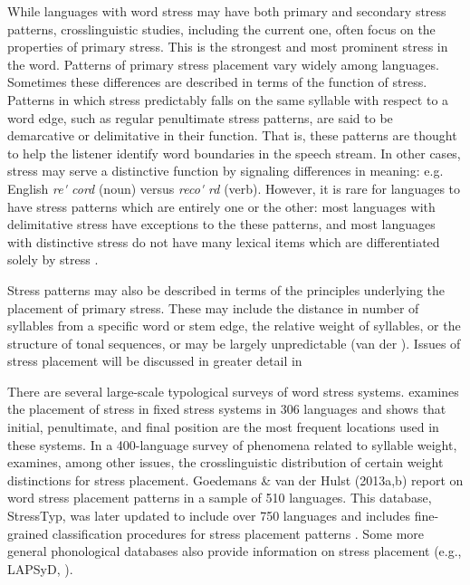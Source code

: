   While languages with word stress may have both primary and secondary stress patterns, crosslinguistic studies, including the current one, often focus on the properties of primary stress. This is the strongest and most prominent stress in the word. Patterns of primary stress placement vary widely among languages. Sometimes these differences are described in terms of the function of stress. Patterns in which stress predictably falls on the same syllable with respect to a word edge, such as regular penultimate stress patterns, are said to be demarcative or delimitative in their function. That is, these patterns are thought to help the listener identify word boundaries in the speech stream. In other cases, stress may serve a distinctive function by signaling differences in meaning: e.g. English \textit{re\'{} cord} (noun) versus \textit{reco\'{} rd} (verb). However, it is rare for languages to have stress patterns which are entirely one or the other: most languages with delimitative stress have exceptions to the these patterns, and most languages with distinctive stress do not have many lexical items which are differentiated solely by stress \citep[14-15]{Cruttenden1997}. 

  Stress patterns may also be described in terms of the principles underlying the placement of primary stress. These may include the distance in number of syllables from a specific word or stem edge, the relative weight of syllables, or the structure of tonal sequences, or may be largely unpredictable (van der \citealt{Hulst2010}). Issues of stress placement will be discussed in greater detail in 

  There are several large-scale typological surveys of word stress systems. \citet{Hyman1977} examines the placement of stress in fixed stress systems in 306 languages and shows that initial, penultimate, and final position are the most frequent locations used in these systems. In a 400-language survey of phenomena related to syllable weight, \citet{Gordon2006} examines, among other issues, the crosslinguistic distribution of certain weight distinctions for stress placement. Goedemans \& van der Hulst (2013a,b) report on word stress placement patterns in a sample of 510 languages. This database, StressTyp, was later updated to include over 750 languages and includes fine-grained classification procedures for stress placement patterns \citep{GoedemansEtAl2017}. Some more general phonological databases also provide information on stress placement (e.g., LAPSyD, \citealt{MaddiesonEtAl2013}).

